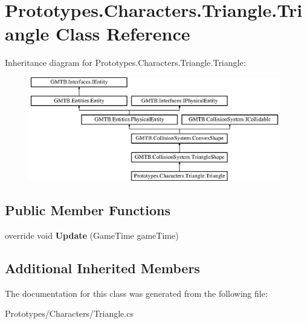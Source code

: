 \hypertarget{class_prototypes_1_1_characters_1_1_triangle_1_1_triangle}{}\section{Prototypes.\+Characters.\+Triangle.\+Triangle Class Reference}
\label{class_prototypes_1_1_characters_1_1_triangle_1_1_triangle}
Inheritance diagram for Prototypes.\+Characters.\+Triangle.\+Triangle\+:\begin{figure}[H]
\begin{center}
\leavevmode
\includegraphics[height=4.534413cm]{class_prototypes_1_1_characters_1_1_triangle_1_1_triangle}
\end{center}
\end{figure}
\subsection*{Public Member Functions}
\begin{DoxyCompactItemize}
\item 
\mbox{\label{class_prototypes_1_1_characters_1_1_triangle_1_1_triangle_aedbe532fe289d32df2f09aab2039cc58}} 
override void {\bfseries Update} (Game\+Time game\+Time)
\end{DoxyCompactItemize}
\subsection*{Additional Inherited Members}


The documentation for this class was generated from the following file\+:\begin{DoxyCompactItemize}
\item 
Prototypes/\+Characters/Triangle.\+cs\end{DoxyCompactItemize}
